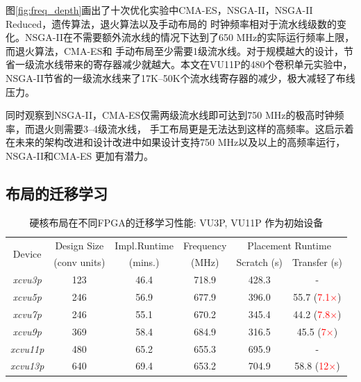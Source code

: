图\ref{fig:freq_depth}画出了十次优化实验中CMA-ES，NSGA-II，NSGA-II Reduced，遗传算法，退火算法以及手动布局的
时钟频率相对于流水线级数的变化。NSGA-II在不需要额外流水线的情况下达到了650 MHz的实际运行频率上限，而退火算法，CMA-ES和
手动布局至少需要1级流水线。对于规模越大的设计，节省一级流水线带来的寄存器减少就越大。本文在VU11P的480个卷积单元实验中，
NSGA-II节省的一级流水线来了17K--50K个流水线寄存器的减少，极大减轻了布线压力。

同时观察到NSGA-II，CMA-ES仅需两级流水线即可达到750 MHz的极高时钟频率，而退火则需要3--4级流水线，
手工布局更是无法达到这样的高频率。这启示着在未来的架构改进和设计改进中如果设计支持750 MHz以及以上的高频率运行，NSGA-II和CMA-ES
更加有潜力。



\subsection{布局的迁移学习}

\begin{table}[h!]
    \caption{硬核布局在不同FPGA的迁移学习性能: VU3P, VU11P 作为初始设备}
    \label{table:port}
    \centering
    \begin{adjustbox}{width=0.8\columnwidth,center}
    \begin{tabular}{c|c c c c c}
      \toprule
  \multirow{2}{*}{Device}     & Design Size 		& Impl.Runtime 		& Frequency 	 & \multicolumn{2}{c}{Placement Runtime}    			\\ \cline{5-6}
                                 & (conv units)		& (mins.)				& (MHz)			 & 	Scratch (s)			& 	Transfer (s)				\\
      \midrule
      \emph{xcvu3p}  			& 123				&	46.4			& 718.9			 & 428.3				& - 							\\
      \emph{xcvu5p}  			& 246				&   56.9				& 677.9	 		 & 396.0				& 55.7 	(\textcolor{red}{7.1$\times$})							\\
      \emph{xcvu7p}  			& 246			    &   55.1				& 670.2	 		 & 345.4				& 44.2 	(\textcolor{red}{7.8$\times$})							\\
      \emph{xcvu9p}  			& 369	   			&   58.4				& 684.9	 		 & 316.5				& 45.5 	(\textcolor{red}{7$\times$})							\\ 
      \midrule
      \emph{xcvu11p} 			& 480	      	    &	65.2          	& 655.3	 		 & 695.9				& -								\\	
      \emph{xcvu13p} 			& 640        	    & 	69.4   			& 653.2	 		 & 704.9				& 58.8	(\textcolor{red}{12$\times$})			\\
      \bottomrule
    \end{tabular}
    \vspace{-0.1in}
    \end{adjustbox}
  \end{table}

